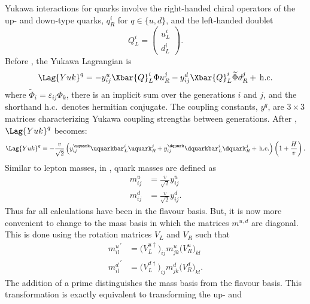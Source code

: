 Yukawa interactions for quarks involve the right-handed chiral operators of the up- and down-type
quarks, $q_R^i$ for $q\in\{u,d\}$, and the left-handed doublet
\begin{equation}
  Q_L^i = \begin{pmatrix}u^i_L\\d^i_L\end{pmatrix}.
\end{equation}
Before \SSB, the Yukawa Lagrangian is
\begin{equation}
  \Lag{Yuk}^q = - y_{ij}^u\Xbar{Q}_L^i\Phi u_R^j
  - y_{ij}^d\Xbar{Q}_L^i\widetilde\Phi d_R^j +\,\mathrm{h.c.}
  \label{eq:th:lagyukq}
\end{equation}
where $\widetilde\Phi_i = \varepsilon_{ij}\Phi_k$, there is an implicit sum over the generations
$i$ and $j$, and the shorthand h.c.~denotes hermitian conjugate.
The coupling constants, $y^{q}$, are $3\times3$ matrices characterizing Yukawa coupling strengths
between generations.
After \SSB, $\Lag{Yuk}^q$ becomes:
\begin{equation}
  \Lag{Yuk}^q =
  - \frac{v}{\sqrt{2}}
  \left(
  y_{ij}^\uquark\uquarkbar_L^i\uquark_R^j
  + y_{ij}^\dquark\dquarkbar_L^i\dquark_R^j
  +\,\mathrm{h.c.}
  \right)
  \left(1 + \frac{H}{v}\right).
  \label{eq:th:lagyuk2}
\end{equation}
Similar to lepton masses, in , quark masses are defined as
\begin{align}
  m_{ij}^u &= \frac{v}{\sqrt{2}}y_{ij}^u \nonumber\\
  m_{ij}^d &= \frac{v}{\sqrt{2}}y_{ij}^d.
\end{align}
Thus far all calculations have been in the flavour basis.
But, it is now more convenient to change
to the mass basis in which the matrices $m^{u,d}$ are diagonal.
This is done
using the rotation matrices $V_L$ and $V_R$ such that
\begin{align}
  {m_{il}^{u}}^\prime &=  \big(V_L^{u\dagger}\big)_{ij} m_{jk}^u\big(V_R^u\big)_{kl} \nonumber\\
  {m_{il}^{d}}^\prime &=  \big(V_L^{d\dagger}\big)_{ij} m_{jk}^d\big(V_R^d\big)_{kl}.
\end{align}
The addition of a prime distinguishes the mass basis from the flavour basis.
This transformation is exactly equivalent to transforming the up- and
